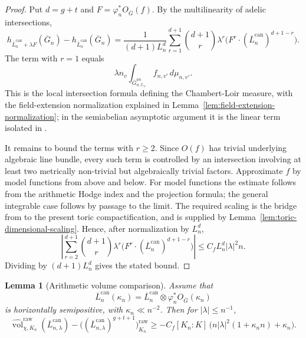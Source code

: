 \documentclass[10pt,a4paper]{amsart}
\theoremstyle{plain}
\newtheorem{lemma}[theorem]{Lemma}
\theoremstyle{plain}
\numberwithin{equation}{section}
\providecommand{\ol}{\overline}
\providecommand{\can}{\operatorname{can}}
\begin{document}
\begin{proof}
	Put \(d=g+t\) and \(F=\varphi_n^*O_{\ol G}(f)\).  By the multilinearity of
	adelic intersections,
	\[
	h_{\ol L_n^{\can}+\lambda F}(\ol G_n)
	-h_{\ol L_n^{\can}}(\ol G_n)
	=
	\frac{1}{(d+1)L_n^d}
	\sum_{r=1}^{d+1}
	\binom{d+1}{r}\lambda^r
	\bigl(F^r\cdot(\ol L_n^{\can})^{d+1-r}\bigr).
	\]
	The term with \(r=1\) equals
	\[
	\lambda n_v
	\int_{\ol G_{n,\mathbb{C}_{v'}}^{an}}
	f_{n,v'}\,d\mu_{n,v'}.
	\]
	This is the local intersection formula defining the Chambert-Loir measure,
	with the field-extension normalization explained in
	Lemma~\ref{lem:field-extension-normalization}; in the semiabelian asymptotic
	argument it is the linear term isolated in \cite[Lemma~4.4]{Ku1}.
	
	It remains to bound the terms with \(r\ge2\).  Since \(O(f)\) has trivial
	underlying algebraic line bundle, every such term is controlled by an
	intersection involving at least two metrically non-trivial but algebraically
	trivial factors.  Approximate \(f\) by model functions from above and below.
	For model functions the estimate follows from the arithmetic Hodge index and
	the projection formula; the general integrable case follows by passage to the
	limit.  The required scaling is the bridge from \cite[Lemma~4.4]{Ku1} to the
	present toric compactification, and is supplied by
	Lemma~\ref{lem:toric-dimensional-scaling}.  Hence, after normalization by
	\(L_n^d\),
	\[
	\left|
	\sum_{r=2}^{d+1}
	\binom{d+1}{r}\lambda^r
	\bigl(F^r\cdot(\ol L_n^{\can})^{d+1-r}\bigr)
	\right|
	\le
	C_f L_n^d |\lambda|^2 n.
	\]
	Dividing by \((d+1)L_n^d\) gives the stated bound.
\end{proof}

\begin{lemma}[Arithmetic volume comparison]
	\label{lem:canonical-volume}
	Assume that
	\[
	\ol L_n^{\can}(\kappa_n)
	=
	\ol L_n^{\can}\otimes\varphi_n^*O_{\ol G}(\kappa_n)
	\]
	is horizontally semipositive, with \(\kappa_n\ll n^{-2}\).  Then for
	\(|\lambda|\le n^{-1}\),
	\[
	\widehat{\operatorname{vol}}_{\chi,K_n}^{\mathrm{raw}}(\ol L_{n,\lambda}^{\can})
	-\bigl((\ol L_{n,\lambda}^{\can})^{g+t+1}\bigr)^{\mathrm{raw}}_{K_n}
	\ge
	-C_f [K_n:K]\,
	\bigl(n|\lambda|^2(1+\kappa_n n)+\kappa_n\bigr).
	\]
\end{lemma}
\end{document}
